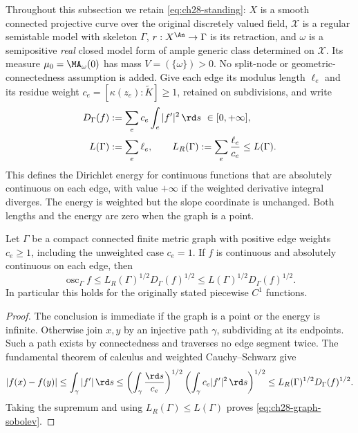 Throughout this subsection we retain \eqref{eq:ch28-standing}:
\(X\) is a smooth connected projective curve over the original discretely
valued field, \(\mathcal X\) is a regular semistable model with skeleton
\(\Gamma\), \(r:X^{\An}\to\Gamma\) is its retraction, and \(\omega\)
is a semipositive \emph{real} closed model form of ample generic class
determined on \(\mathcal X\).  Its measure \(\mu_0=\MA_\omega(0)\)
has mass \(V=(\{\omega\})>0\).  No split-node or geometric-connectedness
assumption is added.  Give each edge its modulus length \(\ell_e\) and
its residue weight \(c_e=[\kappa(z_e):\widetilde K]\geq1\), retained
on subdivisions, and write
\begin{equation}
\label{eq:ch28-dirichlet-form}
\begin{aligned}
 D_\Gamma(f)&:=\sum_e c_e\int_e|f'|^2\,\rd s\ \in[0,+\infty],\\
 L(\Gamma)&:=\sum_e\ell_e,
 \qquad L_R(\Gamma):=\sum_e\frac{\ell_e}{c_e}\leq L(\Gamma).
\end{aligned}
\end{equation}
This defines the Dirichlet energy for continuous functions that are
absolutely continuous on each edge, with value \(+\infty\) if the
weighted derivative integral diverges.  The energy is weighted but the
slope coordinate is unchanged.  Both lengths and the energy are zero
when the graph is a point.

\begin{lemma}
\label{lem:ch28-graph-sobolev}
Let \(\Gamma\) be a compact connected finite metric graph with positive
edge weights \(c_e\geq1\), including the unweighted case \(c_e=1\).
If \(f\) is continuous and absolutely continuous on each edge, then
\begin{equation}
\label{eq:ch28-graph-sobolev}
 \operatorname{osc}_\Gamma f
 \leq L_R(\Gamma)^{1/2}D_\Gamma(f)^{1/2}
 \leq L(\Gamma)^{1/2}D_\Gamma(f)^{1/2}.
\end{equation}
In particular this holds for the originally stated piecewise \(C^1\)
functions.
\end{lemma}

\begin{proof}
The conclusion is immediate if the graph is a point or the energy is
infinite.  Otherwise join \(x,y\) by an injective path \(\gamma\),
subdividing at its endpoints.  Such a path exists by connectedness and
traverses no edge segment twice.  The fundamental theorem of calculus and
weighted Cauchy--Schwarz give
\[
 |f(x)-f(y)|
 \leq\int_\gamma|f'|\,\rd s
 \leq\left(\int_\gamma\frac{\rd s}{c_e}\right)^{1/2}
       \left(\int_\gamma c_e|f'|^2\,\rd s\right)^{1/2}
 \leq L_R(\Gamma)^{1/2}D_\Gamma(f)^{1/2}.
\]
Taking the supremum and using \(L_R(\Gamma)\leq L(\Gamma)\) proves
\eqref{eq:ch28-graph-sobolev}.
\end{proof}

